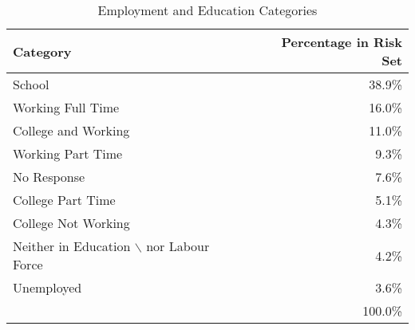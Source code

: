 \begin{table}[htpb]
\centering
\caption{Employment and Education Categories} 
\label{empEduTab}
\begin{tabular}{lr}
  \toprule
\parbox[t]{0.3\textwidth}{\centering Category} & \parbox[t]{0.2\textwidth}{\centering Percentage in Risk Set} \\ 
  \midrule
School & 38.9\% \\ 
  Working Full Time & 16.0\% \\ 
  College and Working & 11.0\% \\ 
  Working Part Time & 9.3\% \\ 
  No Response & 7.6\% \\ 
  College Part Time & 5.1\% \\ 
  College Not Working & 4.3\% \\ 
  Neither in Education $\backslash$ nor Labour Force & 4.2\% \\ 
  Unemployed & 3.6\% \\ 
   & 100.0\% \\ 
   \bottomrule
\end{tabular}
\end{table}
